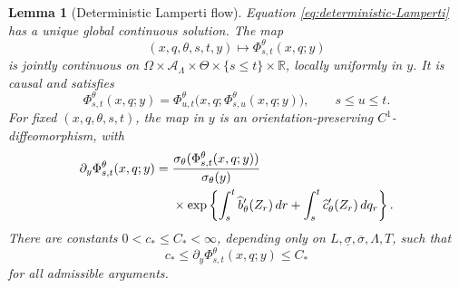 \documentclass[11pt,reqno]{amsart}
\theoremstyle{plain}
\newtheorem{lemma}[lemma]{Lemma}
\theoremstyle{definition}
\newcommand{\R}{\mathbb R}
\newcommand{\cA}{\mathcal A}
\newcommand{\dd}{\,d}
\begin{document}
\begin{lemma}[Deterministic Lamperti flow]\label{lem:deterministic-flow}
Equation \eqref{eq:deterministic-Lamperti} has a unique global continuous
solution.  The map
\[
  (x,q,\theta,s,t,y)\longmapsto\Phi_{s,t}^\theta(x,q;y)
\]
is jointly continuous on
\(\Omega\times\cA_\Lambda\times\Theta\times\{s\le t\}\times\R\), locally
uniformly in \(y\).  It is causal and satisfies
\begin{equation}\label{eq:deterministic-flow-cocycle}
  \Phi_{s,t}^\theta(x,q;y)
  =
  \Phi_{u,t}^\theta
  \bigl(x,q;\Phi_{s,u}^\theta(x,q;y)\bigr),
  \qquad s\le u\le t.
\end{equation}
For fixed \((x,q,\theta,s,t)\), the map in \(y\) is an
orientation-preserving \(C^1\)-diffeomorphism, with
\begin{align}
  \partial_y\Phi_{s,t}^\theta(x,q;y)
  ={}&
  \frac{\sigma_\theta(\Phi_{s,t}^\theta(x,q;y))}
       {\sigma_\theta(y)}
  \notag\\
  &\times
  \exp\left\{
    \int_s^t\widehat b_\theta'(Z_r)\dd r
    +\int_s^t\widehat c_\theta'(Z_r)\dd q_r
  \right\}.
  \label{eq:initial-Jacobian}
\end{align}
There are constants \(0<c_*\le C_*<\infty\), depending only on
\(L,\underline\sigma,\overline\sigma,\Lambda,T\), such that
\begin{equation}\label{eq:uniform-flow-Jacobian}
  c_*\le\partial_y\Phi_{s,t}^\theta(x,q;y)\le C_*
\end{equation}
for all admissible arguments.
\end{lemma}
\end{document}

